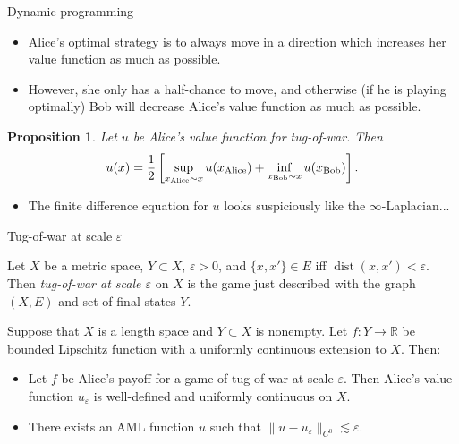 \documentclass[10pt]{beamer}
\newcommand{\RR}{\mathbb{R}}
\DeclareMathOperator{\dist}{dist}
\newtheorem{proposition}{Proposition}
\begin{document}
\begin{frame}{Dynamic programming}
\begin{itemize}
\item Alice's optimal strategy is to always move in a direction which increases her value function as much as possible. 
\item However, she only has a half-chance to move, and otherwise (if he is playing optimally) Bob will decrease Alice's value function as much as possible.  
\end{itemize}

\begin{proposition}
Let $u$ be Alice's value function for tug-of-war. Then 
$$u(x) = \frac{1}{2} \left[\sup_{x_{\rm Alice} \sim x} u(x_{\rm Alice}) + \inf_{x_{\rm Bob} \sim x} u(x_{\rm Bob})\right].$$
\end{proposition}  

\begin{itemize}
\item The finite difference equation for $u$ looks suspiciously like the $\infty$-Laplacian... 
\end{itemize}
\end{frame}

\begin{frame}{Tug-of-war at scale $\varepsilon$}
\begin{definition}
Let $X$ be a metric space, $Y \subset X$, $\varepsilon > 0$, and $\{x, x'\} \in E$ iff $\dist(x, x') < \varepsilon$.
Then \emph{tug-of-war at scale $\varepsilon$} on $X$ is the game just described with the graph $(X, E)$ and set of final states $Y$.
\end{definition} 

\begin{theorem}
Suppose that $X$ is a length space and $Y \subset X$ is nonempty.
Let $f: Y \to \RR$ be bounded Lipschitz function with a uniformly continuous extension to $X$.
Then: 
\begin{itemize}
\item Let $f$ be Alice's payoff for a game of tug-of-war at scale $\varepsilon$.
Then Alice's value function $u_\varepsilon$ is well-defined and uniformly continuous on $X$.  
\item There exists an AML function $u$ such that $\|u - u_\varepsilon\|_{C^0} \lesssim \varepsilon$. 
\end{itemize}
\end{theorem}
\end{frame}
\end{document}
